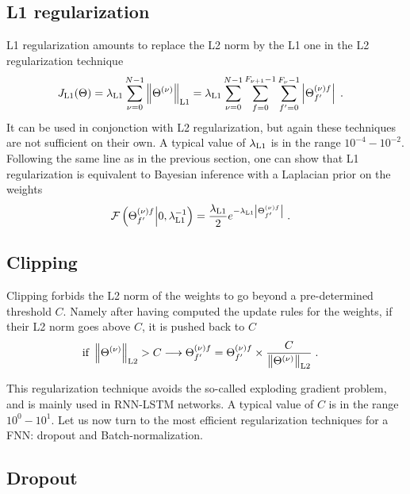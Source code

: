 \subsection{L1 regularization}

L1 regularization amounts to replace the L2 norm by the L1 one in the L2 regularization technique 
\begin{align}
J_{{\rm L1}}(\Theta)&=\lambda_{{\rm L1}} \sum_{\nu=0}^{N-1}\left\|\Theta^{(\nu)}\right\|_{{\rm L1}}
%
=\lambda_{{\rm L1}}\sum_{\nu=0}^{N-1}\sum_{f=0}^{F_{\nu+1}-1}\sum_{f'=0}^{F_\nu-1}
%
\left|\Theta^{(\nu)f}_{f'}\right|\;.
\end{align}
It can be used in conjonction with L2 regularization, but again these techniques are not sufficient on their own. A typical value of $\lambda_{{\rm L1}}$ is in the range $10^{-4}-10^{-2}$. Following the same line as in the previous section, one can show that L1 regularization is equivalent to Bayesian inference with a Laplacian prior on the weights
\begin{align}
\mathcal{F}\left(\Theta^{(\nu)f}_{f'}\middle| 0,\lambda_{{\rm L1}}^{-1}\right)&=
%
\frac{\lambda_{{\rm L1}}}{2}e^{-\lambda_{{\rm L1}}\left|\Theta^{(\nu)f}_{f'}\right|}\;.
\end{align}
 
\subsection{Clipping}

Clipping forbids the L2 norm of the weights to go beyond a pre-determined threshold $C$. Namely after having computed the update rules for the weights, if their L2 norm goes above $C$, it is pushed back to $C$
\begin{align}
{\rm if}\;\left\|\Theta^{(\nu)}\right\|_{{\rm L2}}>C \longrightarrow \Theta^{(\nu)f}_{f'}&=
%
\Theta^{(\nu)f}_{f'} \times \frac{C}{\left\|\Theta^{(\nu)}\right\|_{{\rm L2}}}\;.
\end{align}
 
This regularization technique avoids the so-called exploding gradient problem, and is mainly used in RNN-LSTM networks. A typical value of $C$ is in the range $10^{0}-10^{1}$. Let us now turn to the most efficient regularization techniques for a FNN: dropout and Batch-normalization. 
 
 
\subsection{Dropout}

